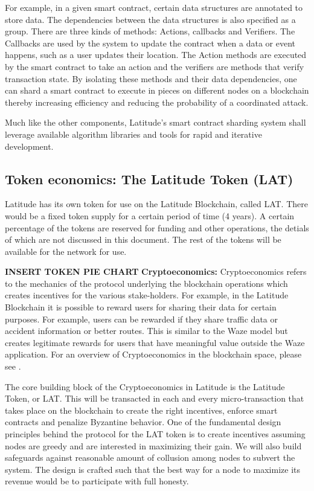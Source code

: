 For example, in a given smart contract, certain data structures are annotated to store data. The dependencies between
the data structures is also specified as a group. There are three kinds of methods: Actions, callbacks and Verifiers. 
The Callbacks are used by the system to update the contract when a data or event happens, such as a user updates their
location. The Action methods are executed by the smart contract to take an action and the verifiers are methods that
verify transaction state. By isolating these methods and their data dependencies, one can shard a smart contract to
execute in pieces on different nodes on a blockchain thereby increasing efficiency and reducing the probability of a
coordinated attack.

Much like the other components, Latitude's smart contract sharding system shall leverage available algorithm libraries
and tools for rapid and iterative development.

\subsection{Token economics: The Latitude Token (LAT)}

Latitude has its own token for use on the Latitude Blockchain, called LAT. There would be a fixed token supply for a
certain period of time (4 years). A certain percentage of the tokens are reserved for funding and other operations, the
detials of which are not discussed in this document. The rest of the tokens will be available for the network for use.

{\bf INSERT TOKEN PIE CHART}
\newline
\noindent
{\bf Cryptoeconomics:}
Cryptoeconomics refers to the mechanics of the protocol underlying the blockchain operations which creates incentives
for the various stake-holders. For example, in the Latitude Blockchain it is possible to reward users for sharing their data
for certain purposes. For example, users can be rewarded if they share traffic data or accident information or better
routes. This is similar to the Waze model but creates legitimate rewards for users that have meaningful value outside
the Waze application. For an overview of Cryptoeconomics in the blockchain space, please see \cite{sinclair_crypto}.

The core building block of the Cryptoeconomics in Latitude is the Latitude Token, or LAT. This will be transacted in
each and every micro-transaction that takes place on the blockchain to create the right incentives, enforce smart
contracts and penalize Byzantine behavior. One of the fundamental design principles behind the protocol for the LAT
token is to create incentives assuming nodes are greedy and are interested in maximizing their gain. We will also build
safeguards against reasonable amount of collusion among nodes to subvert the system. The design is crafted such that the
best way for a node to maximize its revenue would be to participate with full honesty.

